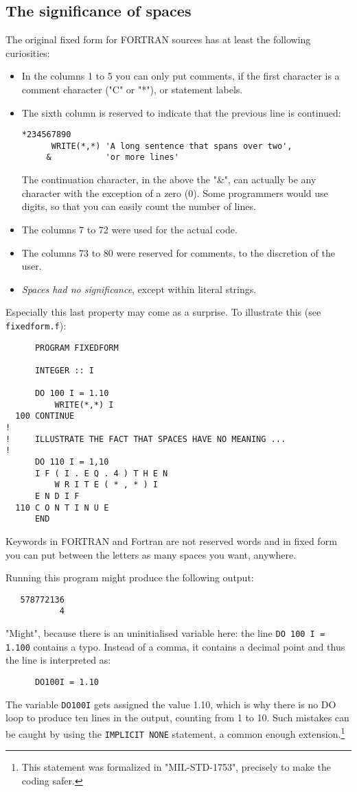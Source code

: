 \subsection{The significance of spaces}
The original fixed form for FORTRAN sources has at least the following curiosities:
\begin{itemize}
\item
In the columns 1 to 5 you can only put comments, if the first character is a comment character ("C" or "*"),
or statement labels.
\item
The sixth column is reserved to indicate that the previous line is continued:
\begin{verbatim}
*234567890
      WRITE(*,*) 'A long sentence that spans over two',
     &           'or more lines'
\end{verbatim}
The continuation character, in the above the "\&", can actually be any character with the exception of
a zero (0). Some programmers would use digits, so that you can easily count the number of lines.
\item
The columns 7 to 72 were used for the actual code.
\item
The columns 73 to 80 were reserved for comments, to the discretion of the user.
\item
\emph{Spaces had no significance}, except within literal strings.
\end{itemize}

Especially this last property may come as a surprise. To illustrate this (see \verb+fixedform.f+):
\begin{verbatim}
      PROGRAM FIXEDFORM

      INTEGER :: I

      DO 100 I = 1.10
          WRITE(*,*) I
  100 CONTINUE
!
!     ILLUSTRATE THE FACT THAT SPACES HAVE NO MEANING ...
!
      DO 110 I = 1,10
      I F ( I . E Q . 4 ) T H E N
          W R I T E ( * , * ) I
      E N D I F
  110 C O N T I N U E
      END
\end{verbatim}
Keywords in FORTRAN and Fortran are not reserved words and in fixed form you can
put between the letters as many spaces you want, anywhere.

Running this program might produce the following output:
\begin{verbatim}
   578772136
           4
\end{verbatim}
"Might", because there is an uninitialised variable here: the line \verb+DO 100 I = 1.100+
contains a typo. Instead of a comma, it contains a decimal point and thus the line is
interpreted as:
\begin{verbatim}
      DO100I = 1.10
\end{verbatim}
The variable \verb+DO100I+ gets assigned the value 1.10, which is why there is no DO loop
to produce ten lines in the output, counting from 1 to 10. Such mistakes can be caught
by using the \verb+IMPLICIT NONE+ statement, a common enough extension.\cite{drFortranImplicit}\footnote{This statement
was formalized in "MIL-STD-1753", precisely to make the coding safer.}


